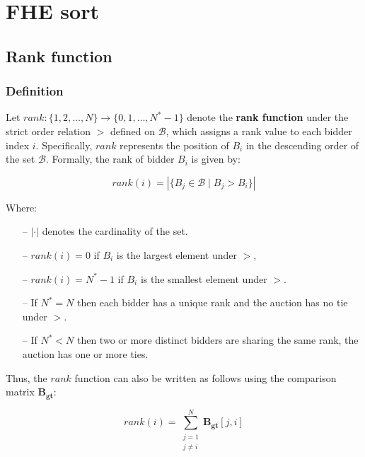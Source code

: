 \section{FHE sort}


\subsection{Rank function}

\subsubsection{Definition}
Let $rank: \{1, 2, \dots, N\} \to \{0, 1, \dots, N^{*}-1\}$ denote the \textbf{rank function} under the strict order relation $>$ defined on $\mathcal{B}$, which assigns a rank value to each bidder index $i$. Specifically, $rank$ represents the position of $B_i$ in the descending order of the set $\mathcal{B}$. Formally, the rank of bidder $B_i$ is given by:

\begin{equation*}
    rank(i) = \left| \{ B_j \in \mathcal{B} \mid B_j > B_i \} \right|
\end{equation*}

Where:
\begin{itemize}
    \setlength\itemsep{0em}
    \item[--]$\left| \cdot \right|$ denotes the cardinality of the set.
    \item[--]$rank(i) = 0$ if $B_i$ is the largest element under $>$,
    \item[--]$rank(i) = N^{*}-1$ if $B_i$ is the smallest element under $>$.
    \item[--]If $N^{*} = N$ then each bidder has a unique rank and the auction has no tie under $>$.
    \item[--]If $N^{*} < N$ then two or more distinct bidders are sharing the same rank, the auction has one or more ties.
\end{itemize}

Thus, the $rank$ function can also be written as follows using the comparison matrix $\mathbf{B_{gt}}$:

\begin{equation*}
    rank(i) = \sum_{\substack{j=1 \\ j \neq i }}^{N} \mathbf{B_{gt}}[j, i]
\end{equation*}

